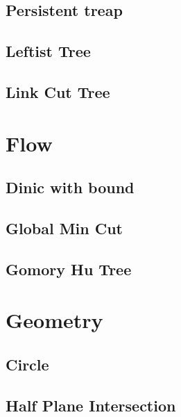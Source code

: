 \documentclass[a4paper,10pt,twocolumn,oneside]{article}
\begin{document}
\subsection{Persistent treap}


\subsection{Leftist Tree}


\subsection{Link Cut Tree}


\section{Flow}
\subsection{Dinic with bound}


\subsection{Global Min Cut}


\subsection{Gomory Hu Tree}


\section{Geometry}
\subsection{Circle}


\subsection{Half Plane Intersection}


%
\end{document}
